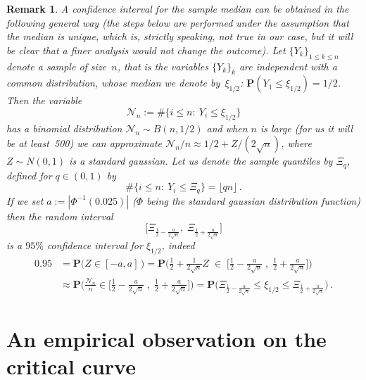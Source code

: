 \documentclass[reqno,11pt]{amsart}
\numberwithin{equation}{section}
\newtheorem{rem}[theorem]{Remark}
\newcommand{\cN}{{\ensuremath{\mathcal N}} }
\newcommand{\bP}{{\ensuremath{\mathbf P}} }
\begin{document}
\begin{rem} \label{rem:conf_int} \rm
A confidence interval for the sample median can be obtained in the following general way
(the steps below are performed under the assumption that the median
is unique, which is, strictly speaking, not true in our case, but it will be clear that
a finer analysis would not change the outcome). Let $\{Y_k\}_{1\le k \le n}$ denote a sample of size~$n$, that is the variables $\{Y_k\}_k$ are independent with a common distribution, whose median we denote by~$\xi_{1/2}$:
$\bP \left(Y_1 \le \xi_{1/2}\right)=1/2$. Then the variable
\begin{equation}
    \cN_n := \# \{i \le n:\ Y_i \le \xi_{1/2}\}
\end{equation}
has a binomial distribution $\cN_n \sim B(n,1/2)$ and when $n$ is large (for us it will be at least~500) we can approximate $\cN_n/n \approx 1/2 + Z/(2\sqrt{n})$, where $Z \sim N(0,1)$ is a standard gaussian. Let us denote the sample quantiles by $\Xi_q$, defined for $q \in (0,1)$ by
\begin{equation}
    \# \{i \le n:\ Y_i \le \Xi_q\} = \lfloor qn \rfloor\,.
\end{equation}
If we set $a:= |\Phi^{-1}(0.025)|$ ($\Phi$ being the standard gaussian distribution function) then the random interval
\begin{equation}
    \Big[\Xi_{\frac{1}{2}-\frac{a}{2\sqrt{n}}},\; \Xi_{\frac{1}{2}+\frac{a}{2\sqrt{n}}}\Big]
\end{equation}
is a $95\%$ confidence interval for $\xi_{1/2}$, indeed
\begin{align}
    0.95 &= \bP \big( Z \in [-a,a] \,\big) = \bP \bigg( \frac 12 + \frac{1}{2\sqrt{n}}Z \;\in\; \Big[\frac{1}{2}-\frac{a}{2\sqrt{n}}\;,\; \frac{1}{2}+\frac{a}{2\sqrt{n}} \Big] \bigg) \nonumber \\
    &\approx \bP \bigg ( \frac{\cN_n}{n} \in \Big[\frac{1}{2}-\frac{a}{2\sqrt{n}}\;,\; \frac{1}{2}+\frac{a}{2\sqrt{n}} \Big] \bigg) = \bP \bigg( \Xi_{\frac{1}{2}-\frac{a}{2\sqrt{n}}} \le \xi_{1/2} \le \Xi_{\frac{1}{2}+\frac{a}{2\sqrt{n}}} \bigg)\,.
\end{align}
\end{rem}



\bigskip
\section{An empirical observation on the critical curve}
\label{sec:guess}
\end{document}

